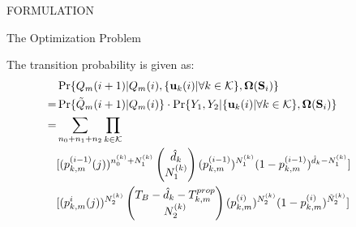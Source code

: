 \documentclass[10pt, conference, letterpaper]{IEEEtran}
\renewcommand{\vec}{\mathbf}
\DeclarePairedDelimiter{\set}{\{}{\}}
\newcommand{\apSet}{\mathcal{K}}
\newcommand{\Stat}{\mathbf{S}}
\newcommand{\Policy}{\mathbf{\Omega}}
\begin{document}
\begin{section}{FORMULATION}
\begin{subsection}{The Optimization Problem}
\begin{itemize}
            \end{itemize}
            The transition probability is given as:
            \begin{align}
                &\Pr\{Q_m(i+1)|Q_m(i), \set{\vec{u}_k(i)|\forall k\in\apSet}, \Policy(\Stat_i)\}
                \nonumber\\
                =& \Pr\{\tilde{Q}_m(i+1)|Q_m(i)\} \cdot \Pr\{Y_1, Y_2|\set{\vec{u}_k(i)|\forall k\in\apSet}, \Policy(\Stat_i)\}
                \nonumber\\
                =& \sum_{n_0+n_1+n_2} \prod_{k\in\apSet}
                \nonumber\\
                &[
                    (p^{(i-1)}_{k,m}(j))^{n^{(k)}_0 + N^{(k)}_1}
                    \begin{pmatrix}
                        \hat{d}_k \\ N^{(k)}_1
                    \end{pmatrix}
                    (p^{(i-1)}_{k,m})^{N^{(k)}_1}
                    (1-p^{(i-1)}_{k,m})^{\hat{d}_k-N^{(k)}_1}
                ]&&
                \nonumber\\
                &[
                    (p^{i}_{k,m}(j))^{N^{(k)}_2}
                    \begin{pmatrix}
                        T_B-\hat{d}_k-T^{prop}_{k,m} \\ N^{(k)}_2
                    \end{pmatrix}
                    (p^{(i)}_{k,m})^{N^{(k)}_2}
                    (1-p^{(i)}_{k,m})^{\tilde{N}^{(k)}_2}
                ]
            \end{align}


\end{subsection}
\end{section}
\end{document}
